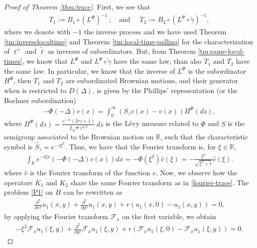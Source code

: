 \documentclass[11pt,a4paper]{article}
\theoremstyle{definition}
\theoremstyle{remark}
\begin{document}
	\begin{proof}[Proof of Theorem \ref{thm:trace}]
		First, we see that
		\begin{align*}
			T_1 := B_1 \circ (L^\Phi)^{-1} \, ; \quad \text{and }\quad T_2:= B_2 \circ (L^\Psi \circ \widetilde{\gamma})^{-1},
		\end{align*}
		where we denote with $-1$  the inverse process and we have used Theorem \ref{tm:inverselocaltime} and Theorem \ref{tm:local-time-pallino} for the characterization of \(\ell^+\) and \(\widetilde{\ell}\) as inverses of subordinators.
		But, from Theorem \ref{tm:same-local-times}, we know that $L^\Phi$ and $L^\Psi \circ \widetilde{\gamma}$ have the same law, than also $T_1$ and $T_2$ have the same law. In particular, we know that the inverse of \(L^\Phi\) is the subordinator \(H^\Phi\), then \(T_1\) and \(T_2\) are subordinated Brownian motions, and their generator when is restricted to ${D}(\Delta)$, is given by the Phillips' representation (or the Bochner subordination) \cite[Theorem 32.1]{sato}
		\begin{align*}
			-\Phi(-\Delta) v(x)= \int_0^\infty (S_zv(x) - v(x)) \Pi^\Phi (dz),
		\end{align*}
		where $\Pi^\Phi(dz)= \frac{e^{-rz} (2rz+1)}{2 \sqrt{\pi} z^{3/2}}\, dz$ is the L\'evy measure related to $\Phi$ and $S$ is the semigroup associated to the Brownian motion on $\mathbb{R}$, such that the characteristic symbol is $\widehat{S}_z = e^{-z \xi^2}$. Thus, we have that the Fourier transform is, for $\xi \in \mathbb{R}$,
		\begin{align}
			\label{fourier-trace}
			\int_{\mathbb{R}} e^{-i \xi x } \left(-\Phi(-\Delta) v(x)\right) dx= -\Phi(\xi^2) \widehat{v}(\xi)= -\frac{\xi^2}{\sqrt{\xi^2 + r}} \widehat{v}(\xi).
		\end{align}
		where $\widehat{v}$ is the Fourier transform of the function $v$. Now, we observe how the operators $K_1$ and $K_2$ share the same Fourier transform as in \eqref{fourier-trace}. The problem \eqref{P1} on \( H \) can be rewritten as
		\begin{align*}
			\frac{\partial^2}{\partial x^2} u_1(x,y) + \frac{\partial^2}{\partial y^2} u_1(x,y) + r (u_1(x,0) - u_1(x,y))=0,
		\end{align*}
		by applying the Fourier transform $\mathcal{F}_x$ on the first variable, we obtain
		\begin{align*}
			- \xi^2 \mathcal{F}_x u_1(\xi,y) + \frac{\partial^2}{\partial y^2} \mathcal{F}_x u_1(\xi,y) + r (\mathcal{F}_x u_1(\xi,0) - \mathcal{F}_x u_1(\xi,y))=0.

\end{align*}
\end{proof}
\end{document}
